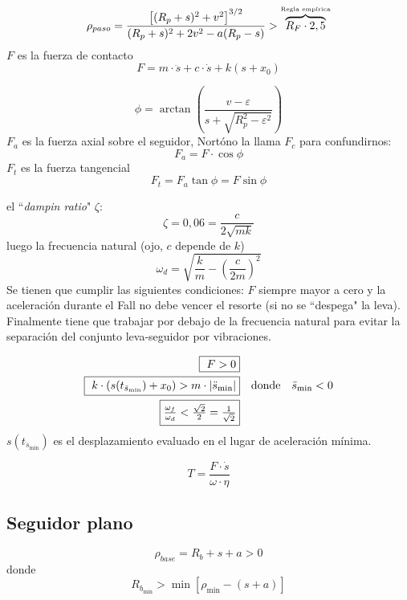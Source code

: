 \documentclass[twocolumn,10pt]{article}
\newcommand{\rmit}[1]{{\fontfamily{cmr}\selectfont #1}}
\newcommand{\Fall}{\rmit{Fall}}
\begin{document}
\[
\rho_{\rmit{paso}} = \frac{ \left[(R_p+s)^2+v^2 \right]^{3/2} }{(R_p+s)^2 +2v^2-a(R_p-s)}> \overbrace{R_F \cdot2,5}^{\textrm{\tiny Regla empírica}}
\]
$F$ es la fuerza de contacto
\[
F = m \cdot \ddot{s}+c\cdot\dot{s}+k(s+x_0)
\]

\[
\phi = \arctan\left( \frac{v-\varepsilon}{s+\sqrt{R_p^2-\varepsilon^2}}\right)
\]
$F_a$ es la fuerza axial sobre el seguidor, Nortóno la llama $F_c$ para confundirnos:
\[
F_a=F\cdot \cos \phi
\]
$F_t$ es la fuerza tangencial
\[
F_t = F_a \tan \phi = F \sin \phi 
\]

el ``\textit{dampin ratio}"{} $\zeta$:
\[
\zeta  = 0,06  = \frac{c}{2\sqrt{mk}}
\]
luego la frecuencia natural (ojo, $c$ depende de $k$)
\[
\omega_d = \sqrt{\frac{k}{m}-\left( \frac{c}{2m} \right)^2}
\]
Se tienen que cumplir las siguientes condiciones: $F$ siempre mayor a cero y la aceleración durante el \Fall{} no debe vencer el resorte (si no se ``despega"{} la leva). Finalmente tiene que trabajar por debajo de la frecuencia natural para evitar la separación del conjunto leva-seguidor por vibraciones.

\begin{align}
   \fbox{ $F>0$}& \\
   \fbox{ $k\cdot \left(s(t_{\ddot{s}_{\min}})+x_0\right)>m\cdot\left| \ddot{s}_{\min} \right|$}& \quad \text{donde}\quad \ddot{s}_{\min}<0 \\
   \fbox{$\frac{\omega_f}{\omega_d}<\frac{\sqrt{2}}{2}=\frac{1}{\sqrt{2}}$}&
\end{align}
$s(t_{\ddot{s}_{\min}})$ es el desplazamiento evaluado en el lugar de aceleración mínima.

\[
T = \frac{F \cdot \dot{s}}{\omega\cdot \eta}
\]

\subsection{Seguidor plano}
\[
\rho_{base} = R_b +s +a >0
\]
donde
\[
R_{b_{\min}} > \min\left[ \rho_{\min} - (s+a)  \right]
\]
\end{document}
